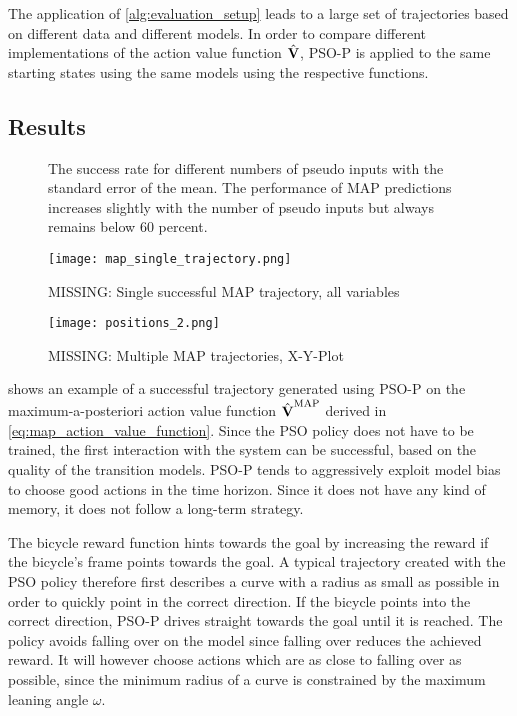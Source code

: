 The application of \cref{alg:evaluation_setup} leads to a large set of trajectories based on different data and different models.
In order to compare different implementations of the action value function $\operatorname{\hat{\operatorname{\mathbf{V}}}}$, PSO-P is applied to the same starting states using the same models using the respective functions.

\subsection{Results}
\begin{figure}[tp]
    \centering
    \caption[Results using MAP predictions]{
        The success rate for different numbers of pseudo inputs with the standard error of the mean.
        The performance of MAP predictions increases slightly with the number of pseudo inputs but always remains below 60 percent.
    }
    \label{fig:map_results}
\end{figure}
\begin{figure}[tp]
    \centering
    \texttt{[image: map\_single\_trajectory.png]}
    \caption{MISSING: Single successful MAP trajectory, all variables}
    \label{fig:map_successful_trajectory}
\end{figure}
\begin{figure}[p]
    \centering
    \texttt{[image: positions\_2.png]}
    \caption{MISSING: Multiple MAP trajectories, X-Y-Plot}
    \label{fig:map_trajectories}
\end{figure}
 shows an example of a successful trajectory generated using PSO-P on the maximum-a-posteriori action value function $\operatorname{\hat{\operatorname{\mathbf{V}}}}^{\text{MAP}}$ derived in \cref{eq:map_action_value_function}.
Since the PSO policy does not have to be trained, the first interaction with the system can be successful, based on the quality of the transition models.
PSO-P tends to aggressively exploit model bias to choose good actions in the time horizon.
Since it does not have any kind of memory, it does not follow a long-term strategy.

The bicycle reward function hints towards the goal by increasing the reward if the bicycle's frame points towards the goal.
A typical trajectory created with the PSO policy therefore first describes a curve with a radius as small as possible in order to quickly point in the correct direction.
If the bicycle points into the correct direction, PSO-P drives straight towards the goal until it is reached.
The policy avoids falling over on the model since falling over reduces the achieved reward.
It will however choose actions which are as close to falling over as possible, since the minimum radius of a curve is constrained by the maximum leaning angle $\omega$.


